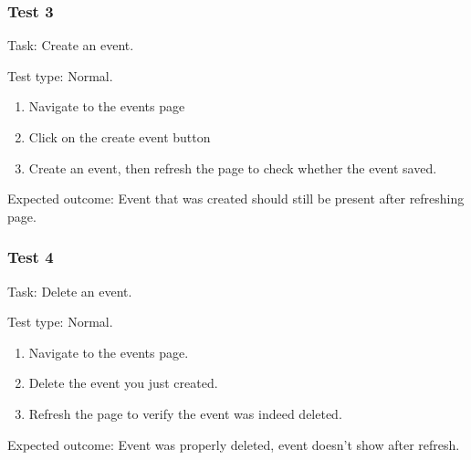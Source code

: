 \vspace{0.2cm}

\subsubsection{Test 3}

{\sffamily Task:} Create an event.\\

{\color{gray} \hrulefill}

{\sffamily Test type: Normal.} \\

\begin{enumerate}
  \item Navigate to the events page \\
  \item Click on the create event button \\
  \item Create an event, then refresh the page to check whether the event saved. \\
\end{enumerate}

{\sffamily Expected outcome: } Event that was created should still be present after refreshing page. \\

{\color{gray} \hrulefill}

\subsubsection{Test 4}

{\sffamily Task:} Delete an event.\\

{\color{gray} \hrulefill}

{\sffamily Test type: Normal.} \\

\begin{enumerate}
  \item Navigate to the events page. \\
  \item Delete the event you just created. \\
  \item Refresh the page to verify the event was indeed deleted. \\
\end{enumerate}

{\sffamily Expected outcome: } Event was properly deleted, event doesn't show after refresh. \\

